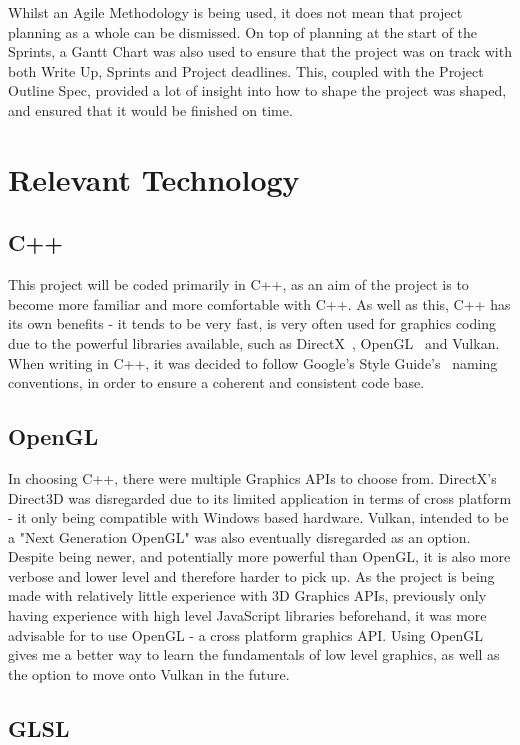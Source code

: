 \documentclass[a4paper,10pt]{report}
\begin{document}
Whilst an Agile Methodology is being used, it does not mean that project planning as a whole can be dismissed. On top of planning at the start of the Sprints, a Gantt Chart was also used to ensure that the project was on track with both Write Up, Sprints and Project deadlines. This, coupled with the Project Outline Spec, provided a lot of insight into how to shape the project was shaped, and ensured that it would be finished on time. \medskip

\section{Relevant Technology}

\subsection{C++}

This project will be coded primarily in C++, as an aim of the project is to become more familiar and more comfortable with C++. As well as this, C++ has its own benefits - it tends to be very fast, is very often used for graphics coding due to the powerful libraries available, such as DirectX~\cite{directx_website}, OpenGL~\cite{OpenGL_website} and Vulkan. When writing in C++, it was decided to follow Google's Style Guide's~\cite{google_c_style_guide} naming conventions, in order to ensure a coherent and consistent code base.

\subsection{OpenGL}
In choosing C++, there were multiple Graphics APIs to choose from. DirectX's Direct3D was disregarded due to its limited application in terms of cross platform - it only being compatible with Windows based hardware. Vulkan, intended to be a "Next Generation OpenGL" was also eventually disregarded as an option. Despite being newer, and potentially more powerful than OpenGL, it is also more verbose and lower level and therefore harder to pick up. As the project is being made with relatively little experience with 3D Graphics APIs, previously only having experience with  high level JavaScript libraries beforehand, it was more advisable for to use OpenGL - a cross platform graphics API. Using OpenGL gives me a better way to learn the fundamentals of low level graphics, as well as the option to move onto Vulkan in the future.

\subsection{GLSL}
\end{document}
